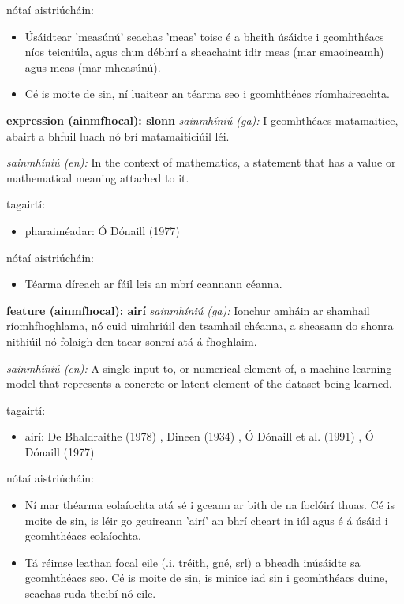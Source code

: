 \documentclass{article}
\begin{document}
nótaí aistriúcháin:
\begin{itemize}
	\item Úsáidtear 'measúnú' seachas 'meas' toisc é a bheith úsáidte i gcomhthéacs níos teicniúla, agus chun débhrí a sheachaint idir meas (mar smaoineamh) agus meas (mar mheasúnú).
	\item Cé is moite de sin, ní luaitear an téarma seo i gcomhthéacs ríomhaireachta.
\end{itemize}


\textbf{expression (ainmfhocal): slonn}
\textit{sainmhíniú (ga):} I gcomhthéacs matamaitice, abairt a bhfuil luach nó brí matamaiticiúil léi.

\textit{sainmhíniú (en):} In the context of mathematics, a statement that has a value or mathematical meaning attached to it.

tagairtí:
\begin{itemize}
	\item pharaiméadar: Ó Dónaill (1977) \cite{odonaill}
\end{itemize}

nótaí aistriúcháin:
\begin{itemize}
	\item Téarma díreach ar fáil leis an mbrí ceannann céanna.
\end{itemize}


\textbf{feature (ainmfhocal): airí}
\textit{sainmhíniú (ga):} Ionchur amháin ar shamhail ríomhfhoghlama, nó cuid uimhriúil den tsamhail chéanna, a sheasann do shonra nithiúil nó folaigh den tacar sonraí atá á fhoghlaim.

\textit{sainmhíniú (en):} A single input to, or numerical element of, a machine learning model that represents a concrete or latent element of the dataset being learned.

tagairtí:
\begin{itemize}
	\item airí: De Bhaldraithe (1978) \cite{de-bhaldraithe}, Dineen (1934) \cite{dineen}, Ó Dónaill et al. (1991) \cite{focloir-beag}, Ó Dónaill (1977) \cite{odonaill}
\end{itemize}

nótaí aistriúcháin:
\begin{itemize}
	\item Ní mar théarma eolaíochta atá sé i gceann ar bith de na foclóirí thuas. Cé is moite de sin, is léir go gcuireann 'airí' an bhrí cheart in iúl agus é á úsáid i gcomhthéacs eolaíochta.
	\item Tá réimse leathan focal eile (.i. tréith, gné, srl) a bheadh inúsáidte sa gcomhthéacs seo. Cé is moite de sin, is minice iad sin i gcomhthéacs duine, seachas ruda theibí nó eile.
\end{itemize}
\end{document}

